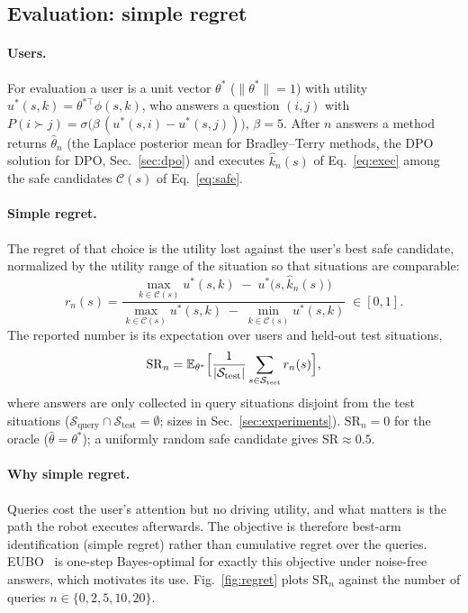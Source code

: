 \subsection{Evaluation: simple regret}
\label{sec:regret}

\paragraph{Users.}
For evaluation a user is a unit vector $\theta^\ast$ ($\lVert\theta^\ast\rVert = 1$) with utility $u^\ast(s,k) = \theta^{\ast\top}\phi(s,k)$,
who answers a question $(i,j)$ with $P(i \succ j) = \sigma\bigl(\beta\,(u^\ast(s,i) - u^\ast(s,j))\bigr)$, $\beta = 5$.
After $n$ answers a method returns $\hat\theta_n$ (the Laplace posterior mean for Bradley--Terry methods, the DPO solution for DPO,
Sec.~\ref{sec:dpo}) and executes $\hat k_n(s)$ of Eq.~\eqref{eq:exec} among the safe candidates $\mathcal{C}(s)$ of Eq.~\eqref{eq:safe}.

\paragraph{Simple regret.}
The regret of that choice is the utility lost against the user's best safe candidate,
normalized by the utility range of the situation so that situations are comparable:
\begin{equation}
  r_n(s) = \frac{\max_{k \in \mathcal{C}(s)} u^\ast(s,k) \;-\; u^\ast\bigl(s,\hat k_n(s)\bigr)}
                {\max_{k \in \mathcal{C}(s)} u^\ast(s,k) \;-\; \min_{k \in \mathcal{C}(s)} u^\ast(s,k)}
  \;\in [0,1].
  \label{eq:regret}
\end{equation}
The reported number is its expectation over users and held-out test situations,
\begin{equation}
  \mathrm{SR}_n = \mathbb{E}_{\theta^\ast}\Bigl[\frac{1}{|\mathcal{S}_{\text{test}}|}
  \sum_{s \in \mathcal{S}_{\text{test}}} r_n(s)\Bigr],
  \label{eq:sr}
\end{equation}
where answers are only collected in query situations disjoint from the test situations
($\mathcal{S}_{\text{query}} \cap \mathcal{S}_{\text{test}} = \emptyset$; sizes in Sec.~\ref{sec:experiments}).
$\mathrm{SR}_n = 0$ for the oracle ($\hat\theta = \theta^\ast$);
a uniformly random safe candidate gives $\mathrm{SR} \approx 0.5$.

\paragraph{Why simple regret.}
Queries cost the user's attention but no driving utility, and what matters is the path the robot
executes afterwards. The objective is therefore best-arm identification (simple regret) rather
than cumulative regret over the queries. EUBO~\citep{astudillo2023qeubo} is one-step Bayes-optimal
for exactly this objective under noise-free answers, which motivates its use.
Fig.~\ref{fig:regret} plots $\mathrm{SR}_n$ against the number of queries $n \in \{0,2,5,10,20\}$.

